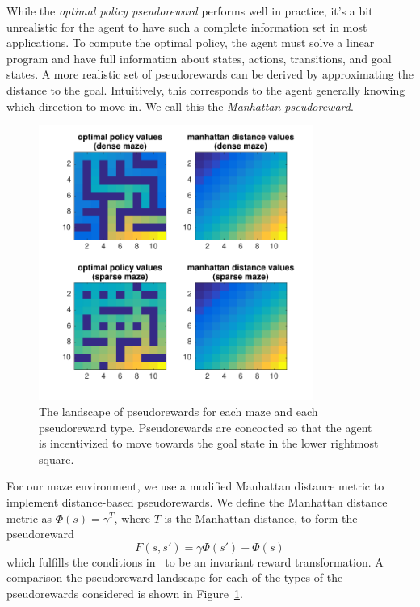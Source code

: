 \documentclass[notitlepage]{article}
\begin{document}
While the \textit{optimal policy pseudoreward} performs well in practice, it's a bit unrealistic for the agent to have such a complete information set in most applications. To compute the optimal policy, the agent must solve a linear program and have full information about states, actions, transitions, and goal states. A more realistic set of pseudorewards can be derived by approximating the distance to the goal. Intuitively, this corresponds to the agent generally knowing which direction to move in. We call this the \textit{Manhattan pseudoreward}.

\begin{figure}[ht]
\centering
\includegraphics[width=0.8\textwidth]{value_landscapes}
\caption{The landscape of pseudorewards for each maze and each pseudoreward type. Pseudorewards are concocted so that the agent is incentivized to move towards the goal state in the lower rightmost square.}
\label{fig:value-landscapes}
\end{figure}

For our maze environment, we use a modified Manhattan distance metric to implement distance-based pseudorewards. We define the Manhattan distance metric as $\Phi(s) = \gamma^T$, where $T$ is the Manhattan distance, to form the pseudoreward
\begin{equation}
F(s, s') = \gamma \Phi(s') - \Phi(s)
\end{equation} 
which fulfills the conditions in~\cite{ng1999policy} to be an invariant reward transformation. A comparison the pseudoreward landscape for each of the types of the pseudorewards considered is shown in Figure~\ref{fig:value-landscapes}.
\end{document}
